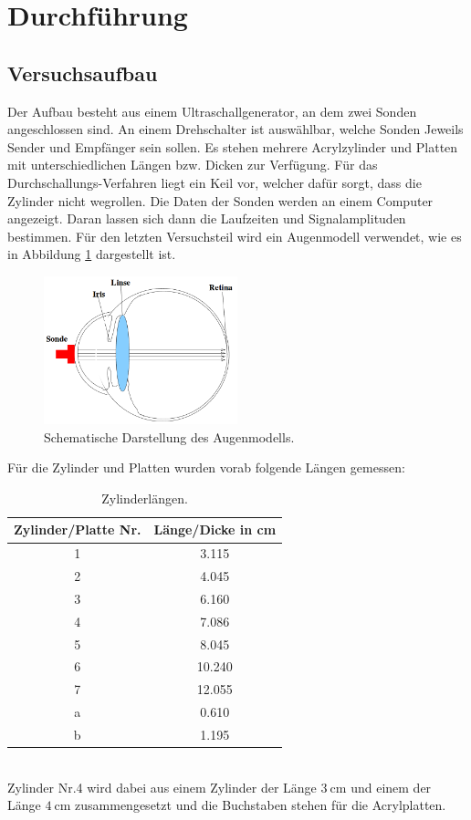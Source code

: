 \documentclass[
  bibliography=totoc,     %
  captions=tableheading,  %
  titlepage=firstiscover, %
]{scrartcl}
\begin{document}
\section{Durchführung}
\label{sec:durchführung}
\subsection{Versuchsaufbau}
\label{sec:aufbau}
Der Aufbau besteht aus einem Ultraschallgenerator, an dem zwei Sonden
angeschlossen sind. An einem Drehschalter ist auswählbar, welche Sonden Jeweils
Sender und Empfänger sein sollen. Es stehen mehrere Acrylzylinder und Platten
mit unterschiedlichen Längen bzw. Dicken zur Verfügung. Für das
Durchschallungs-Verfahren liegt ein Keil vor, welcher dafür sorgt, dass
die Zylinder nicht wegrollen. Die Daten der Sonden werden an einem Computer
angezeigt. Daran lassen sich dann die Laufzeiten und Signalamplituden bestimmen.
Für den letzten Versuchsteil wird ein Augenmodell verwendet, wie es in Abbildung
\ref{fig:auge} dargestellt ist.
\begin{figure}[H]
  \centering
  \includegraphics[width=0.5\textwidth]{Augenmodell.png}
  \caption{Schematische Darstellung des Augenmodells. \cite{anleitung}}
  \label{fig:auge}
\end{figure}
\noindent
Für die Zylinder und Platten wurden vorab folgende Längen gemessen:
\begin{table}
  \centering
  \caption{Zylinderlängen.}
  \label{tab:größen}
  \begin{tabular}{S[table-format=1.0] S}
    \toprule
    {Zylinder/Platte Nr.} & {Länge/Dicke in \si{\centi\meter}} \\
     &  3.115 \\
    2 &  4.045 \\
    3 &  6.160 \\
    4 &  7.086 \\
    5 &  8.045 \\
    6 & 10.240 \\
    7 & 12.055 \\
    a &  0.610 \\
    b &  1.195 \\
    \bottomrule
  \end{tabular}
\end{table}\\
\noindent
Zylinder Nr.4 wird dabei aus einem Zylinder der Länge $\SI{3}{\centi\meter}$
und einem der Länge $\SI{4}{\centi\meter}$ zusammengesetzt und die Buchstaben
stehen für die Acrylplatten.
\clearpage
\end{document}
